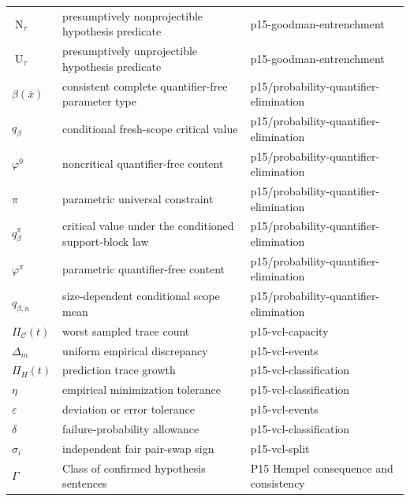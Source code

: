 \begin{longtable}{@{}p{}p{}p{}@{}}
\(\operatorname{N}_\tau\) & presumptively nonprojectible hypothesis predicate & p15-\allowbreak{}goodman-\allowbreak{}entrenchment \\
\(\operatorname{U}_\tau\) & presumptively unprojectible hypothesis predicate & p15-\allowbreak{}goodman-\allowbreak{}entrenchment \\
\(\beta(\bar x)\) & consistent complete quantifier-free parameter type & p15/\allowbreak{}probability-\allowbreak{}quantifier-\allowbreak{}elimination \\
\(q_\beta\) & conditional fresh-scope critical value & p15/\allowbreak{}probability-\allowbreak{}quantifier-\allowbreak{}elimination \\
\(\varphi^0\) & noncritical quantifier-free content & p15/\allowbreak{}probability-\allowbreak{}quantifier-\allowbreak{}elimination \\
\(\pi\) & parametric universal constraint & p15/\allowbreak{}probability-\allowbreak{}quantifier-\allowbreak{}elimination \\
\(q_\beta^\pi\) & critical value under the conditioned support-block law & p15/\allowbreak{}probability-\allowbreak{}quantifier-\allowbreak{}elimination \\
\(\varphi^\pi\) & parametric quantifier-free content & p15/\allowbreak{}probability-\allowbreak{}quantifier-\allowbreak{}elimination \\
\(q_{\beta,n}\) & size-dependent conditional scope mean & p15/\allowbreak{}probability-\allowbreak{}quantifier-\allowbreak{}elimination \\
\(\Pi_{\mathcal C}(t)\) & worst sampled trace count & p15-\allowbreak{}vcl-\allowbreak{}capacity \\
\(\Delta_m\) & uniform empirical discrepancy & p15-\allowbreak{}vcl-\allowbreak{}events \\
\(\Pi_H(t)\) & prediction trace growth & p15-\allowbreak{}vcl-\allowbreak{}classification \\
\(\eta\) & empirical minimization tolerance & p15-\allowbreak{}vcl-\allowbreak{}classification \\
\(\varepsilon\) & deviation or error tolerance & p15-\allowbreak{}vcl-\allowbreak{}events \\
\(\delta\) & failure-probability allowance & p15-\allowbreak{}vcl-\allowbreak{}classification \\
\(\sigma_i\) & independent fair pair-swap sign & p15-\allowbreak{}vcl-\allowbreak{}split \\
\(\Gamma\) & Class of confirmed hypothesis sentences & P15 Hempel consequence and consistency \\

\end{longtable}
